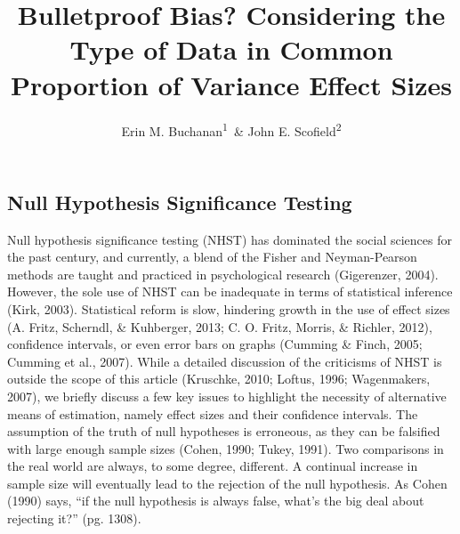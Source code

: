 \documentclass[english,man]{apa6}
\title{Bulletproof Bias? Considering the Type of Data in Common Proportion of
Variance Effect Sizes}
\author{Erin M. Buchanan\textsuperscript{1}~\& John E. Scofield\textsuperscript{2}}
\affiliation{
    \vspace{0.5cm}
          \textsuperscript{1} Missouri State University\\
          \textsuperscript{2} University of Missouri  }
\theoremstyle{definition}
\theoremstyle{definition}
\theoremstyle{definition}
\theoremstyle{remark}
\begin{document}
\maketitle

\setcounter{secnumdepth}{0}



\subsection{Null Hypothesis Significance
Testing}\label{null-hypothesis-significance-testing}

Null hypothesis significance testing (NHST) has dominated the social
sciences for the past century, and currently, a blend of the Fisher and
Neyman-Pearson methods are taught and practiced in psychological
research (Gigerenzer, 2004). However, the sole use of NHST can be
inadequate in terms of statistical inference (Kirk, 2003). Statistical
reform is slow, hindering growth in the use of effect sizes (A. Fritz,
Scherndl, \& Kuhberger, 2013; C. O. Fritz, Morris, \& Richler, 2012),
confidence intervals, or even error bars on graphs (Cumming \& Finch,
2005; Cumming et al., 2007). While a detailed discussion of the
criticisms of NHST is outside the scope of this article (Kruschke, 2010;
Loftus, 1996; Wagenmakers, 2007), we briefly discuss a few key issues to
highlight the necessity of alternative means of estimation, namely
effect sizes and their confidence intervals. The assumption of the truth
of null hypotheses is erroneous, as they can be falsified with large
enough sample sizes (Cohen, 1990; Tukey, 1991). Two comparisons in the
real world are always, to some degree, different. A continual increase
in sample size will eventually lead to the rejection of the null
hypothesis. As Cohen (1990) says, \enquote{if the null hypothesis is
always false, what's the big deal about rejecting it?} (pg. 1308).
\end{document}
